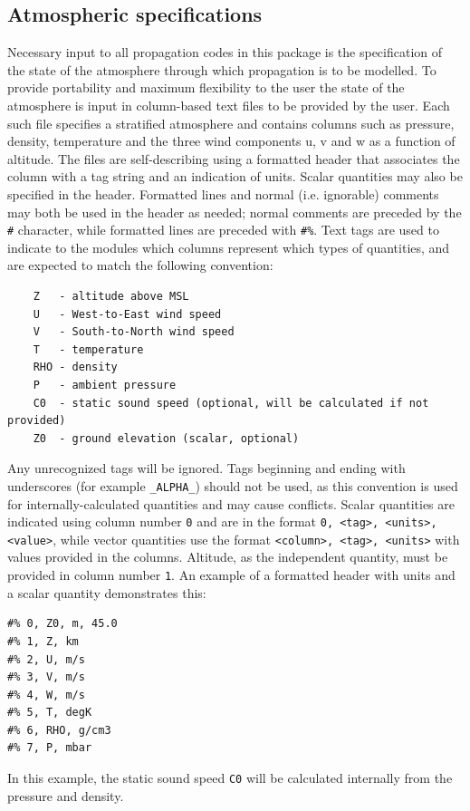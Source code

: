 \subsection{Atmospheric specifications}
\label{sec: AtmoSpecs}
Necessary input to all propagation codes in this package is the specification of the state of the atmosphere through which propagation is to be modelled. To provide portability and maximum flexibility to the user the state of the atmosphere is input in column-based text files to be provided by the user. Each such file specifies a stratified atmosphere and contains columns such as pressure, density, temperature and the three wind components u, v and w as a function of altitude. The files are self-describing using a formatted header that associates the column with a tag string and an indication of units.  Scalar quantities may also be specified in the header.  Formatted lines and normal (i.e. ignorable) comments may both be used in the header as needed; normal comments are preceded by the \verb"#" character, while formatted lines are preceded with \verb"#%".  Text tags are used to indicate to the modules which columns represent which types of quantities, and are expected to match the following convention:
\begin{verbatim}
    Z   - altitude above MSL
    U   - West-to-East wind speed
    V   - South-to-North wind speed
    T   - temperature
    RHO - density
    P   - ambient pressure
    C0  - static sound speed (optional, will be calculated if not provided)
    Z0  - ground elevation (scalar, optional)
\end{verbatim}

Any unrecognized tags will be ignored. Tags beginning and ending with underscores (for example \verb"_ALPHA_") should not be used, as this convention is used for internally-calculated quantities and may cause conflicts. Scalar quantities are indicated using column number \verb"0" and are in the format \verb"0, <tag>, <units>, <value>", while vector quantities use the format \verb"<column>, <tag>, <units>" with values provided in the columns.  Altitude, as the independent quantity, must be provided in column number \verb"1".  An example of a formatted header with units and a scalar quantity demonstrates this:
\begin{verbatim}
#% 0, Z0, m, 45.0
#% 1, Z, km
#% 2, U, m/s
#% 3, V, m/s
#% 4, W, m/s
#% 5, T, degK
#% 6, RHO, g/cm3
#% 7, P, mbar
\end{verbatim}
In this example, the static sound speed \verb"C0" will be calculated internally from the pressure and density.

